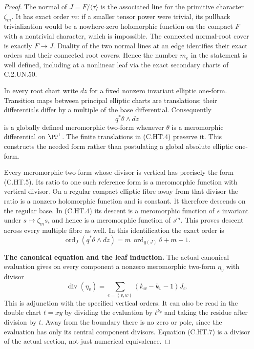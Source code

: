 \begin{proof}
The normal of $J=F/\langle\tau\rangle$ is the associated line for
the primitive character $\zeta_m$. It has exact order $m$:
if a smaller tensor power were trivial, its pullback trivialization
would be a nowhere-zero holomorphic function on the compact $F$
with a nontrivial character, which is impossible. The connected
normal-root cover is exactly $F\to J$. Duality of the two normal
lines at an edge identifies their exact orders and their connected
root covers. Hence the number $m_e$ in the statement is well defined,
including at a nonlinear leaf via the exact secondary charts of
C.2.UN.50.

In every root chart write $dz$ for a fixed nonzero invariant
elliptic one-form. Transition maps between principal elliptic
charts are translations; their differentials differ by a multiple
of the base differential. Consequently
\[
                         q^*\theta\wedge dz             \tag{C.HT.5}
\]
is a globally defined meromorphic two-form whenever $\theta$ is a
meromorphic differential on $\PP^1$. The finite translations in
(C.HT.4) preserve it. This constructs the needed form rather than
postulating a global absolute elliptic one-form.

Every meromorphic two-form whose divisor is vertical has precisely
the form (C.HT.5). Its ratio to one such reference form is a
meromorphic function with vertical divisor. On a regular compact
elliptic fibre away from that divisor the ratio is a nonzero
holomorphic function and is constant. It therefore descends on
the regular base. In (C.HT.4) its descent is a meromorphic function
of $s$ invariant under $s\mapsto\zeta_ms$, and hence is a
meromorphic function of $s^m$. This proves descent across every
multiple fibre as well. In this identification the exact order is
\[
 \operatorname{ord}_J(q^*\theta\wedge dz)
               =m\,\operatorname{ord}_{q(J)}\theta+m-1 .
                                                        \tag{C.HT.6}
\]

\par\medskip\noindent\textbf{The canonical equation and the leaf induction.}
The actual canonical evaluation gives on every component a
nonzero meromorphic two-form $\eta_v$ with divisor
\[
 \operatorname{div}(\eta_v)
       =\sum_{e=(v,w)}(k_w-k_v-1)J_e .                 \tag{C.HT.7}
\]
This is adjunction with the specified vertical orders. It can also
be read in the double chart $t=xy$ by dividing the evaluation by
$t^{k_v}$ and taking the residue after division by $t$. Away from
the boundary there is no zero or pole, since the evaluation has
only its central component divisors. Equation (C.HT.7) is a divisor
of the actual section, not just numerical equivalence.


\end{proof}

